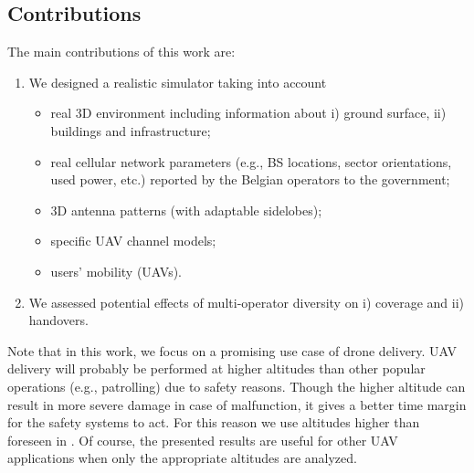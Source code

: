 \subsection{Contributions}
The main contributions of this work are:
\begin{enumerate}
    \item We designed a realistic simulator taking into account
    \begin{itemize}
        \item real 3D environment including information about i) ground surface, ii) buildings and infrastructure;
        \item real cellular network parameters (e.g., BS locations, sector orientations, used power, etc.) reported by the Belgian operators to the government;
        \item 3D antenna patterns (with adaptable sidelobes);
        \item specific UAV channel models;
        \item users' mobility (UAVs).
    \end{itemize}
    \item We assessed potential effects of multi-operator diversity on i) coverage and ii) handovers.
\end{enumerate}
Note that in this work, we focus on a promising use case of drone delivery. UAV delivery will probably be performed at higher altitudes than other popular operations (e.g., patrolling) due to safety reasons. Though the higher altitude can result in more severe damage in case of malfunction, it gives a better time margin for the safety systems to act. For this reason we use altitudes higher than foreseen in \cite{ICAO}. Of course, the presented results are useful for other UAV applications when only the appropriate altitudes are analyzed.